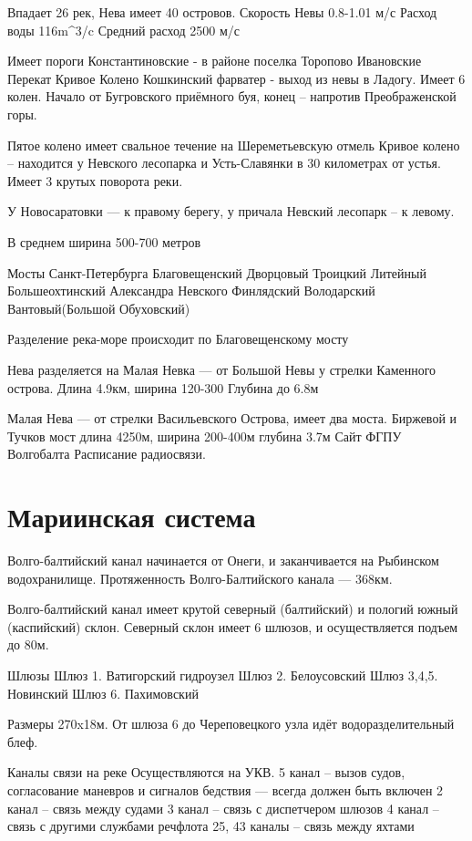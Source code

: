 \documentclass{article}        %
\begin{document}
Впадает 26 рек, Нева имеет 40 островов.
Скорость Невы 0.8-1.01 м/с
Расход воды 116m^3/c	
Средний расход 2500 м/с

Имеет пороги
	Константиновские - в районе поселка Торопово
	Ивановские
	Перекат Кривое Колено
	Кошкинский фарватер - выход из невы в Ладогу. Имеет 6 колен. Начало от Бугровского приёмного буя, конец -- напротив Преображенской горы.

Пятое колено имеет свальное течение на Шереметьевскую отмель
Кривое колено -- находится у Невского лесопарка и Усть-Славянки в 30 километрах от устья. Имеет 3 крутых поворота реки.

У Новосаратовки --- к правому берегу, у причала Невский лесопарк -- к левому.

В среднем ширина 500-700 метров

Мосты Санкт-Петербурга
	Благовещенский
	Дворцовый
	Троицкий
	Литейный
	Большеохтинский
	Александра Невского
	Финлядский
	Володарский
	Вантовый(Большой Обуховский)

Разделение река-море происходит по Благовещенскому мосту

Нева разделяется на
	Малая Невка --- от Большой Невы у стрелки Каменного острова. Длина 4.9км, ширина 120-300 
		Глубина до 6.8м
	
	Малая Нева --- от стрелки Васильевского Острова, имеет два моста. Биржевой и Тучков мост
		длина 4250м, 
		ширина 200-400м
		глубина 3.7м
Сайт ФГПУ Волгобалта
	Расписание радиосвязи.

\section{Мариинская система}
Волго-балтийский канал начинается от Онеги, и заканчивается на Рыбинском водохранилище. Протяженность Волго-Балтийского канала --- 368км.

Волго-балтийский канал имеет крутой северный (балтийский) и пологий южный (каспийский) склон.
Северный склон имеет 6 шлюзов, и осуществляется подъем до 80м.

Шлюзы
	Шлюз 1. Ватигорский гидроузел
	Шлюз 2. Белоусовский
	Шлюз 3,4,5. Новинский
	Шлюз 6. Пахимовский

Размеры 270x18м.
От шлюза 6 до Череповецкого узла идёт водоразделительный блеф.

Каналы связи на реке
Осуществляются на УКВ.
	5 канал -- вызов судов, согласование маневров и 
		сигналов бедствия --- всегда должен быть включен
	2 канал -- связь между судами
	3 канал -- связь с диспетчером шлюзов
	4 канал -- связь с другими службами речфлота
	25, 43 каналы -- связь между яхтами
\end{document}
